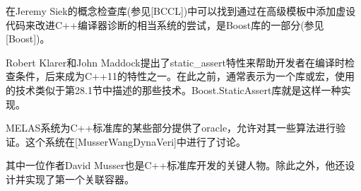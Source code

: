 在Jeremy Siek的概念检查库(参见[BCCL])中可以找到通过在高级模板中添加虚设代码来改进C++编译器诊断的相当系统的尝试，是Boost库的一部分(参见[Boost])。

Robert Klarer和John Maddock提出了static\_assert特性来帮助开发者在编译时检查条件，后来成为C++11的特性之一。在此之前，通常表示为一个库或宏，使用的技术类似于第28.1节中描述的那些技术。Boost.StaticAssert库就是这样一种实现。

MELAS系统为C++标准库的某些部分提供了oracle，允许对其一些算法进行验证。这个系统在[MusserWangDynaVeri]中进行了讨论。

\begin{notice}其中一位作者David Musser也是C++标准库开发的关键人物。除此之外，他还设计并实现了第一个关联容器。
\end{notice}
